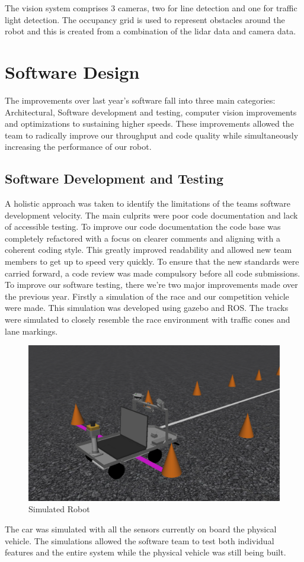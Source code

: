 \documentclass[11pt,journal]{IEEEtran}
\begin{document}
The vision system comprises 3 cameras, two for line detection and one for traffic light detection. The occupancy grid is used to represent obstacles around the robot and this is created from a combination of the lidar data and camera data.

\section{Software Design}
The improvements over last year's software fall into three main categories: Architectural, Software development and testing, computer vision improvements and optimizations to sustaining higher speeds. These improvements allowed the team to radically improve our throughput and code quality while simultaneously increasing the performance of our robot.

\subsection{Software Development and Testing}
A holistic approach was taken to identify the limitations of the teams software development velocity. The main culprits were poor code documentation and lack of accessible testing.
To improve our code documentation the code base was completely refactored with a focus on clearer comments and aligning with a coherent coding style. This greatly improved readability and allowed new team members to get up to speed very quickly. To ensure that the new standards were carried forward, a code review was made compulsory before all code submissions.
To improve our software testing, there we're two major improvements made over the previous year. Firstly a simulation of the race and our competition vehicle were made. This simulation was developed using gazebo and ROS. The tracks were simulated to closely resemble the race environment with traffic cones and lane markings.
\begin{figure}[ht]
\centerline{\includegraphics[width=0.9\columnwidth]{simulated_robot.png}}
\caption{Simulated Robot}
\label{Sim_Robot}
\end{figure}
The car was simulated with all the sensors currently on board the physical vehicle. The simulations allowed the software team to test both individual features and the entire system while the physical vehicle was still being built.
\end{document}
